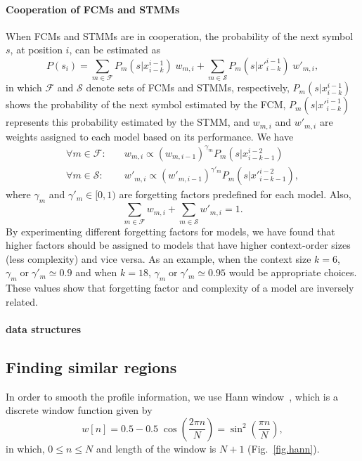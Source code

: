 \paragraph{Cooperation of FCMs and STMMs}
When FCMs and STMMs are in cooperation, the probability of the next symbol $s$, at position $i$, can be estimated as
\begin{equation}
P(s_i) = \sum_{m\in\mathcal{F}} P_m(s|x_{i-k}^{i-1})\;w_{m,i} + \sum_{m\in\mathcal{S}} P_m(s|{x'}_{i-k}^{i-1})\;w'_{m,i},
\end{equation}
in which $\mathcal{F}$ and $\mathcal{S}$ denote sets of FCMs and STMMs, respectively, $P_m(s|x_{i-k}^{i-1})$ shows the probability of the next symbol estimated by the FCM, $P_m(s|{x'}_{i-k}^{i-1})$ represents this probability estimated by the STMM, and $w_{m,i}$ and $w'_{m,i}$ are weights assigned to each model based on its performance. We have
\begin{align}
\forall m\in\mathcal{F}:\quad &w_{m,i} \propto (w_{m,i-1})^{\gamma_m} P_m(s | x_{i-k-1}^{i-2})
\nonumber
\\[1mm]
\forall m\in\mathcal{S}:\quad &w'_{m,i} \propto (w'_{m,i-1})^{\gamma'_m} P_m(s | {x'}_{i-k-1}^{i-2}),
\end{align}
where $\gamma_m$ and $\gamma'_m \in [0,1)$ are forgetting factors predefined for each model. Also,
\begin{equation}
\sum_{m\in\mathcal{F}} w_{m,i} + \sum_{m\in\mathcal{S}} w'_{m,i} = 1.
\end{equation}
By experimenting different forgetting factors for models, we have found that higher factors should be assigned to models that have higher context-order sizes (less complexity) and vice versa. As an example, when the context size $k=6$, $\gamma_m \mathrm{\;or\;} \gamma'_m \simeq 0.9$ and when $k=18$, $\gamma_m \mathrm{\;or\;} \gamma'_m \simeq 0.95$ would be appropriate choices. These values show that forgetting factor and complexity of a model are inversely related.

\paragraph{data structures}



\subsection{Finding similar regions}

In order to smooth the profile information, we use Hann window~\cite{blackman1959particular}, which is a discrete window function given by
\begin{equation}
  \label{eq.hann}
  w[n]=0.5-0.5\;\cos \left({\frac {2\pi n}{N}}\right)=\sin ^{2}\left({\frac {\pi n}{N}}\right),
\end{equation}
in which, $0\le n\le N$ and length of the window is $N+1$ (Fig.~\ref{fig.hann}).

